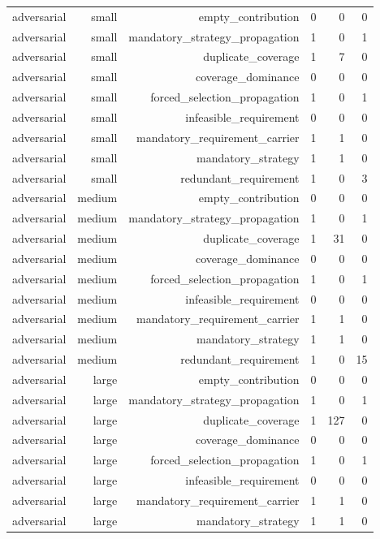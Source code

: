 {\begin{longtable}{lrrrrr}
adversarial & small & empty\_contribution & 0 & 0 & 0 \\
adversarial & small & mandatory\_strategy\_propagation & 1 & 0 & 1 \\
adversarial & small & duplicate\_coverage & 1 & 7 & 0 \\
adversarial & small & coverage\_dominance & 0 & 0 & 0 \\
adversarial & small & forced\_selection\_propagation & 1 & 0 & 1 \\
adversarial & small & infeasible\_requirement & 0 & 0 & 0 \\
adversarial & small & mandatory\_requirement\_carrier & 1 & 1 & 0 \\
adversarial & small & mandatory\_strategy & 1 & 1 & 0 \\
adversarial & small & redundant\_requirement & 1 & 0 & 3 \\
adversarial & medium & empty\_contribution & 0 & 0 & 0 \\
adversarial & medium & mandatory\_strategy\_propagation & 1 & 0 & 1 \\
adversarial & medium & duplicate\_coverage & 1 & 31 & 0 \\
adversarial & medium & coverage\_dominance & 0 & 0 & 0 \\
adversarial & medium & forced\_selection\_propagation & 1 & 0 & 1 \\
adversarial & medium & infeasible\_requirement & 0 & 0 & 0 \\
adversarial & medium & mandatory\_requirement\_carrier & 1 & 1 & 0 \\
adversarial & medium & mandatory\_strategy & 1 & 1 & 0 \\
adversarial & medium & redundant\_requirement & 1 & 0 & 15 \\
adversarial & large & empty\_contribution & 0 & 0 & 0 \\
adversarial & large & mandatory\_strategy\_propagation & 1 & 0 & 1 \\
adversarial & large & duplicate\_coverage & 1 & 127 & 0 \\
adversarial & large & coverage\_dominance & 0 & 0 & 0 \\
adversarial & large & forced\_selection\_propagation & 1 & 0 & 1 \\
adversarial & large & infeasible\_requirement & 0 & 0 & 0 \\
adversarial & large & mandatory\_requirement\_carrier & 1 & 1 & 0 \\
adversarial & large & mandatory\_strategy & 1 & 1 & 0 \\

\end{longtable}}
